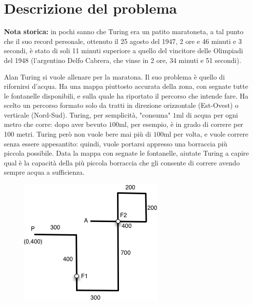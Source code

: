 \documentclass[a4paper,11pt]{article}
\begin{document}
\vspace{0.5cm}



\section*{Descrizione del problema}
  
\textbf{Nota storica:} in pochi sanno che Turing era un patito
maratoneta, a tal punto che il suo record personale, ottenuto il 25
agosto del 1947, 2 ore e 46 minuti e 3 secondi,  è stato di soli 11
minuti superiore a quello del vincitore delle Olimpiadi del 1948
(l'argentino Delfo Cabrera, che vinse in 2 ore, 34 minuti e 51 secondi).

Alan Turing si vuole allenare per la maratona. Il suo problema è quello
di rifornirsi d'acqua. Ha una mappa piuttosto accurata della zona, con
segnate tutte le fontanelle disponibili, e sulla quale ha riportato il
percorso che intende fare. Ha scelto un percorso formato solo da tratti
in direzione orizzontale (Est-Ovest) o verticale (Nord-Sud). Turing, per
semplicità, "consuma" $1$ml di acqua per ogni metro che corre: dopo aver
bevuto $100$ml, per esempio, è in grado di correre per 100 metri. Turing
però non vuole bere mai più di $100$ml per volta, e vuole correre senza
essere appesantito: quindi, vuole portarsi appresso una borraccia più
piccola possibile. Data la mappa con segnate le fontanelle, aiutate
Turing a capire qual è la capacità della più piccola borraccia che gli
consente di correre avendo sempre acqua a sufficienza.
    
\begin{figure}[h!]
  \centering
  \caption{}
  \includegraphics{figura.png}
\end{figure}
\end{document}
